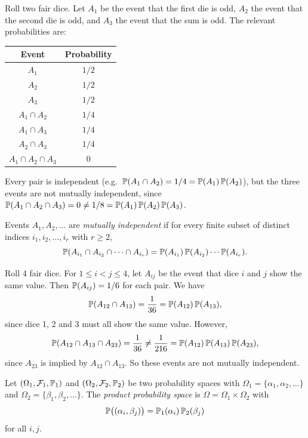 \documentclass[a4paper]{article}
\begin{document}
\begin{eg}
  Roll two fair dice. Let $A_1$ be the event that the first die is odd, $A_2$ the event that the second die is odd, and $A_3$ the event that the sum is odd. The relevant probabilities are:
  \begin{center}
    \begin{tabular}{cc}
      \toprule
      Event & Probability\\
      \midrule
      $A_1$ & $1/2$\\
      $A_2$ & $1/2$\\
      $A_3$ & $1/2$\\
      $A_1\cap A_2$ & $1/4$\\
      $A_1\cap A_3$ & $1/4$\\
      $A_2\cap A_3$ & $1/4$\\
      $A_1\cap A_2\cap A_3$ & $0$\\
      \bottomrule
    \end{tabular}
  \end{center}
  Every pair is independent (e.g.\ $\P(A_1 \cap A_2) = 1/4 = \P(A_1)\,\P(A_2)$), but the three events are not mutually independent, since $\P(A_1\cap A_2\cap A_3) = 0 \neq 1/8 = \P(A_1)\,\P(A_2)\,\P(A_3)$.
\end{eg}

\begin{defi}
  Events $A_1, A_2, \dotsc$ are \emph{mutually independent} if for every finite subset of distinct indices $i_1, i_2, \dotsc, i_r$ with $r \geq 2$,
  \[
    \P(A_{i_1}\cap A_{i_2} \cap \cdots \cap A_{i_r}) = \P(A_{i_1})\,\P(A_{i_2})\cdots \P(A_{i_r}).
  \]
\end{defi}

\begin{eg}
  Roll 4 fair dice. For $1 \leq i < j \leq 4$, let $A_{ij}$ be the event that dice $i$ and $j$ show the same value. Then $\P(A_{ij}) = 1/6$ for each pair. We have
  \[
    \P(A_{12}\cap A_{13}) = \frac{1}{36} = \P(A_{12})\,\P(A_{13}),
  \]
  since dice 1, 2 and 3 must all show the same value. However,
  \[
    \P(A_{12}\cap A_{13}\cap A_{23}) = \frac{1}{36} \neq \frac{1}{216} = \P(A_{12})\,\P(A_{13})\,\P(A_{23}),
  \]
  since $A_{23}$ is implied by $A_{12} \cap A_{13}$. So these events are not mutually independent.
\end{eg}

\begin{defi}
  Let $(\Omega_1, \mathcal{F}_1, \P_1)$ and $(\Omega_2, \mathcal{F}_2, \P_2)$ be two probability spaces with $\Omega_1 = \{\alpha_1, \alpha_2, \dotsc\}$ and $\Omega_2 = \{\beta_1, \beta_2, \dotsc\}$. The \emph{product probability space} is $\Omega = \Omega_1\times \Omega_2$ with
  \[
    \P\bigl((\alpha_i, \beta_j)\bigr) = \P_1(\alpha_i)\,\P_2(\beta_j)
  \]
  for all $i, j$.
\end{defi}
\end{document}
